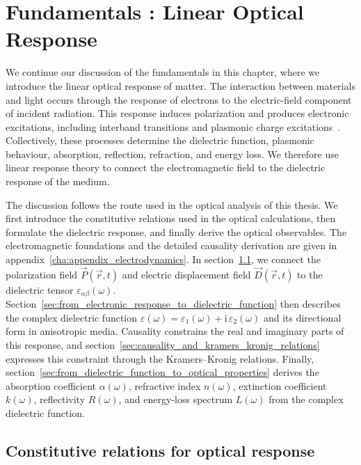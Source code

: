 \chapter{Fundamentals : Linear Optical Response}
\label{cha:fundamentals_b}

We continue our discussion of the fundamentals in this chapter, where we introduce the linear optical response of matter.
The interaction between materials and light occurs through the response of electrons to the electric-field component of incident radiation.
This response induces polarization and produces electronic excitations, including interband transitions and plasmonic charge excitations~\cite{basov2016polaritons,caruso2018electron}.
Collectively, these processes determine the dielectric function, plasmonic behaviour, absorption, reflection, refraction, and energy loss.
We therefore use linear response theory to connect the electromagnetic field to the dielectric response of the medium.

The discussion follows the route used in the optical analysis of this thesis.
We first introduce the constitutive relations used in the optical calculations, then formulate the dielectric response, and finally derive the optical observables.
The electromagnetic foundations and the detailed causality derivation are given in appendix~\ref{cha:appendix_electrodynamics}.
In section~\ref{sec:constitutive_relations_for_optical_response}, we connect the polarization field $\vec{P}(\vec{r},t)$ and electric displacement field $\vec{D}(\vec{r},t)$ to the dielectric tensor $\varepsilon_{\alpha\beta}(\omega)$.
Section~\ref{sec:from_electronic_response_to_dielectric_function} then describes the complex dielectric function $\varepsilon(\omega)=\varepsilon_1(\omega)+\mathrm{i}\,\varepsilon_2(\omega)$ and its directional form in anisotropic media.
Causality constrains the real and imaginary parts of this response, and section~\ref{sec:causality_and_kramers_kronig_relations} expresses this constraint through the Kramers--Kronig relations.
Finally, section~\ref{sec:from_dielectric_function_to_optical_properties} derives the absorption coefficient $\alpha(\omega)$, refractive index $n(\omega)$, extinction coefficient $k(\omega)$, reflectivity $R(\omega)$, and energy-loss spectrum $L(\omega)$ from the complex dielectric function.

\newpage
\FloatBarrier
\section{Constitutive relations for optical response}
\label{sec:constitutive_relations_for_optical_response}

